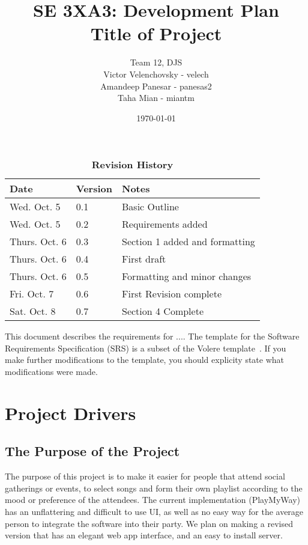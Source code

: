 \documentclass[12pt, titlepage]{article}
\title{SE 3XA3: Development Plan\\Title of Project}
\author{Team 12, DJS
	\\ Victor Velenchovsky - velech
	\\ Amandeep Panesar - panesas2
	\\ Taha Mian - miantm
}
\date{\today}
\begin{document}
\maketitle

\tableofcontents
\listoftables
\listoffigures

\begin{table}[bp]
\caption{\bf Revision History}
\begin{tabularx}{\textwidth}{p{3cm}p{2cm}X}
\toprule {\bf Date} & {\bf Version} & {\bf Notes}\\
\midrule
Wed. Oct. 5 & 0.1 & Basic Outline \\
Wed. Oct. 5 & 0.2 & Requirements added \\
Thurs. Oct. 6 & 0.3 & Section 1 added and formatting \\
Thurs. Oct. 6 & 0.4 & First draft \\
Thurs. Oct. 6 & 0.5 & Formatting and minor changes \\
Fri. Oct. 7 & 0.6 & First Revision complete \\
Sat. Oct. 8 & 0.7 & Section 4 Complete\\
\bottomrule
\end{tabularx}
\end{table}

\newpage


This document describes the requirements for ....  The template for the Software
Requirements Specification (SRS) is a subset of the Volere
template~\citep{RobertsonAndRobertson2012}.  If you make further modifications
to the template, you should explicity state what modifications were made.

\section{Project Drivers}

\subsection{The Purpose of the Project}
The purpose of this project is to make it easier for people that attend social
gatherings or events, to select songs and form their own playlist according to
the mood or preference of the attendees. The current implementation (PlayMyWay)
has an unflattering and difficult to use UI, as well as no easy way for the
average person to integrate the software into their party. We plan on making a
revised version that has an elegant web app interface, and an easy to install
server.
\end{document}
